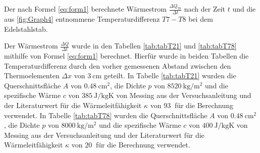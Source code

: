 \begin{table}
	\centering
	\caption{Der nach Formel \eqref{eq:form1} berechnete Wärmestrom $\frac{\Delta Q_{78}}{\Delta t}$ nach der Zeit $t$ und die aus \ref{fig:Graph4} entnommene Temperaturdifferenz $T7-T8$ bei dem Edelstahlstab.}
	
\end{table}
Der Wärmestrom $\frac{\Delta Q}{\Delta t}$ wurde in den Tabellen \ref{tab:tabT21} und \ref{tab:tabT78} mithilfe von Formel \eqref{eq:form1} berechnet. Hierfür wurde in beiden Tabellen die Temperaturdifferenz durch den vorher gemessenen Abstand zwischen den Thermoelementen $\Delta x$ von $\SI{3}{\centi\meter}$ geteilt. In Tabelle \ref{tab:tabT21} wurden die Querschnittsfläche $A$ von $\SI{0.48}{\centi\meter\squared}$, die Dichte $p$ von $\SI{8520}{\kilo\gram\per\meter\squared}$ und die spezifische Wärme $c$ von $\SI{385}{\joule\per\kilo\gram\kelvin}$ von Messing aus der Versuchsanleitung \cite{V204} und der Literaturwert für die Wärmeleitfähigkeit $\kappa$ von $\SI{93}{}$ für die Berechnung verwendet.
In Tabelle \ref{tab:tabT78} wurden die Querschnittsfläche $A$ von $\SI{0.48}{\centi\meter\squared}$, die Dichte $p$ von $\SI{8000}{\kilo\gram\per\meter\squared}$ und die spezifische Wärme $c$ von $\SI{400}{\joule\per\kilo\gram\kelvin}$ von Messing aus der Versuchsanleitung \cite{V204} und der Literaturwert für die Wärmeleitfähigkeit $\kappa$ von $\SI{20}{}$ für die Berechnung verwendet. 

